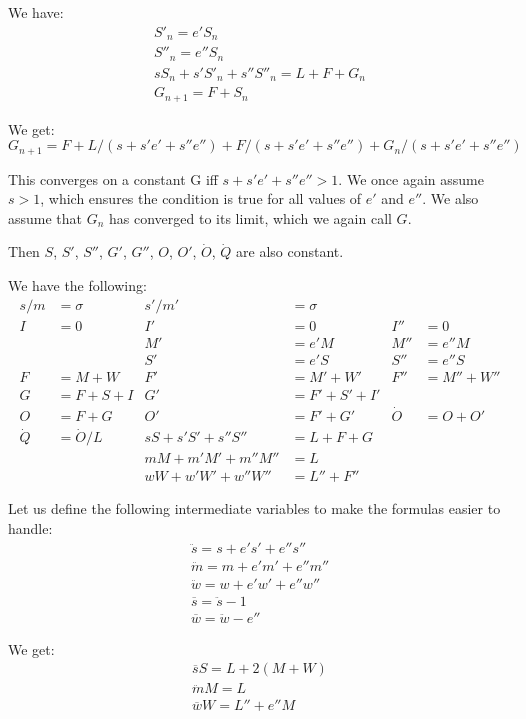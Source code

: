 \documentclass{article}
\begin{document}
We have:
\begin{gather*}
S'_n = e'S_n \\
S''_n = e''S_n \\
sS_n + s'S'_n + s''S''_n = L + F + G_n \\
G_{n+1} = F + S_n
\end{gather*}

We get:
\begin{equation}
G_{n+1} = F + L/(s+s'e'+s''e'') + F/(s+s'e'+s''e'') + G_n/(s+s'e'+s''e'')
\end{equation}

This converges on a constant G iff $s+s'e'+s''e'' > 1$. We once again
assume $s > 1$, which ensures the condition is true for all values of
$e'$ and $e''$. We also assume that $G_n$ has converged to its limit,
which we again call $G$.

Then $S$, $S'$, $S''$, $G'$, $G''$, $O$, $O'$,
$\dot{O}$, $\dot{Q}$ are also constant.

We have the following:
\begin{align*}
s/m &= \sigma  &  s'/m' &= \sigma \\
I &= 0  &  I' &= 0  &  I'' &= 0  \\
 & & M' &= e'M  &  M'' &= e''M \\
 & & S' &= e'S  &  S'' &= e''S \\
F &= M + W  &  F' &= M' + W'  &  F'' &= M'' + W'' \\
G &= F + S + I  &  G' &= F' + S' + I' \\
O &= F + G  &  O' &= F' + G' & \dot{O} &= O + O' \\
\dot{Q} &= \dot{O}/L  & sS + s'S' + s''S'' &= L + F + G \\
             &         &  mM + m'M' + m''M'' &= L \\
             &         &  wW + w'W' + w''W'' &= L'' + F''
\end{align*}

Let us define the following intermediate variables to make the
formulas easier to handle:
\begin{gather}
\ddot{s} = s + e's' + e''s'' \\
\ddot{m} = m + e'm' + e''m'' \\
\ddot{w} = w + e'w' + e''w'' \\
\overline{s} = \ddot{s} - 1 \\
\overline{w} = \ddot{w} - e''
\end{gather}

We get:
\begin{gather}
\overline{s} S = L + 2(M + W) \\
\ddot{m}M = L \\
\overline{w}W = L'' + e'' M
\end{gather}
\end{document}
